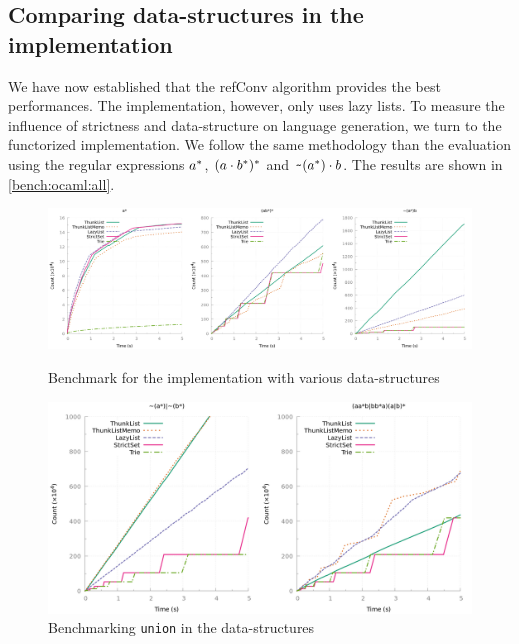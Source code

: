 \subsection{Comparing data-structures in the \ocaml implementation}

We have now established that the refConv algorithm provides the best performances.
The \haskell implementation, however, only uses lazy lists. To measure
the influence of strictness and data-structure on language generation,
we turn to the functorized \ocaml implementation.
We follow the same methodology than the \haskell evaluation using
the regular expressions
$a^*$, $(a \cdot{b^*})^*$ and
$\texttt{\textasciitilde}{(a^*)} \cdot{b}$.
The results are shown in \cref{bench:ocaml:all}.

\begin{figure}[b]
  \centering
  \includegraphics[height=0.33\linewidth]{measure/ocaml_all.png}
  \caption{Benchmark for the \ocaml implementation with various data-structures}
  \label{bench:ocaml:all}
  \includegraphics[height=0.33\linewidth]{measure/ocaml_union.png}
  \caption{Benchmarking \texttt{union} in the \ocaml data-structures}
  \label{bench:ocaml:union}
\end{figure}

